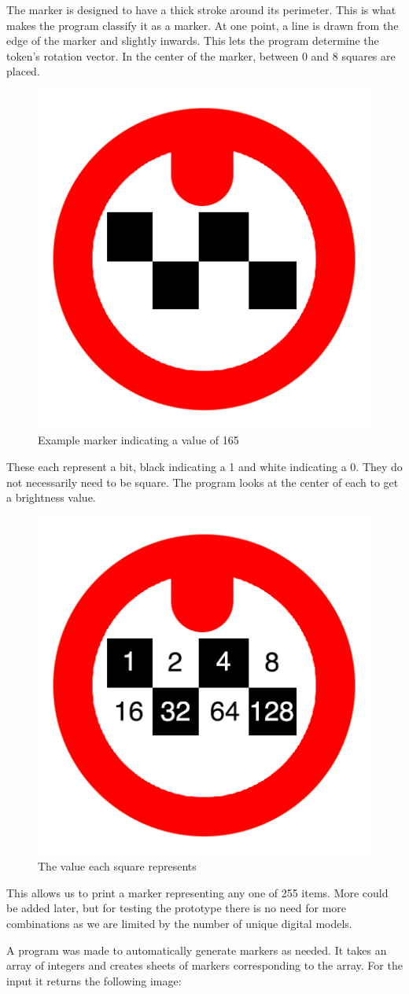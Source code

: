 The marker is designed to have a thick stroke around its perimeter. This is what makes the program classify it as a marker. At one point, a line is drawn from the edge of the marker and slightly inwards. This lets the program determine the token's rotation vector. In the center of the marker, between 0 and 8 squares are placed.
\begin{figure}[H]
	\centering
	\includegraphics[width=0.3\linewidth]{figure/Analysis/circleexample2}
	\caption{Example marker indicating a value of 165}
	\label{fig:circle2}
\end{figure}

These each represent a bit, black indicating a 1 and white indicating a 0. They do not necessarily need to be square. The program looks at the center of each to get a brightness value.

\begin{figure}[H]
	\centering
	\includegraphics[width=0.3\linewidth]{figure/Analysis/circleexample}
	\caption{The value
		 each square represents}
	\label{fig:circle}
\end{figure}

This allows us to print a marker representing any one of 255 items. More could be added later, but for testing the prototype there is no need for more combinations as we are limited by the number of unique digital models.

A program was made to automatically generate markers as needed. It takes an array of integers and creates sheets of markers corresponding to the array. For the input  it returns the following image:

